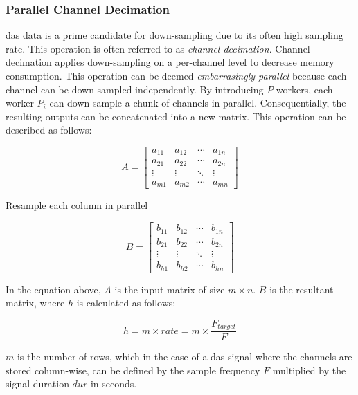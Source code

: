 \subsubsection{Parallel Channel Decimation}

\acrshort{das} data is a prime candidate for down-sampling due to its often high sampling rate. This operation is often referred to as \textit{channel decimation}. Channel decimation applies down-sampling on a per-channel level to decrease memory consumption. This operation can be deemed \textit{embarrasingly parallel} because each channel can be down-sampled independently. By introducing $P$ workers, each worker $P_i$ can down-sample a chunk of channels in parallel. Consequentially, the resulting outputs can be concatenated into a new matrix. This operation can be described as follows:

\[
A = \begin{bmatrix}
a_{11} & a_{12} & \cdots & a_{1n} \\
a_{21} & a_{22} & \cdots & a_{2n} \\
\vdots & \vdots & \ddots & \vdots \\
a_{m1} & a_{m2} & \cdots & a_{mn}
\end{bmatrix}
\]


\begin{center}
Resample each column in parallel
\end{center}


\[
B = \begin{bmatrix}
b_{11} & b_{12} & \cdots & b_{1n} \\
b_{21} & b_{22} & \cdots & b_{2n} \\
\vdots & \vdots & \ddots & \vdots \\
b_{h1} & b_{h2} & \cdots & b_{hn}
\end{bmatrix}
\]

In the equation above, $A$ is the input matrix of size $m \times n$.  $B$ is the resultant matrix, where $h$ is calculated as follows: 

$$h = m \times rate = m \times \dfrac{F_{target}}{F}$$

$m$ is the number of rows, which in the case of a \acrshort{das} signal where the channels are stored column-wise, can be defined by the sample frequency $F$ multiplied by the signal duration $dur$ in seconds.